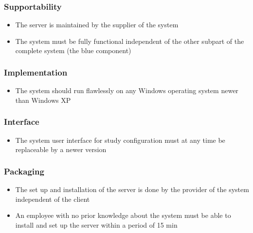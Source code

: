 \subsubsection{Supportability}

\begin{itemize}
\item The server is maintained by the supplier of the system
\item The system must be fully functional independent of the other subpart of the complete system (the blue component)
\end{itemize}

\subsubsection{Implementation}

\begin{itemize}
\item The system should run flawlessly on any Windows operating system newer than Windows XP
\end{itemize}

\subsubsection{Interface}

\begin{itemize}
\item The system user interface for study configuration must at any time be replaceable by a newer version
\end{itemize}

\subsubsection{Packaging}

\begin{itemize}
\item The set up and installation of the server is done by the provider of the system independent of the client
\item An employee with no prior knowledge about the system must be able to install and set up the server within a period of 15 min
\end{itemize}

